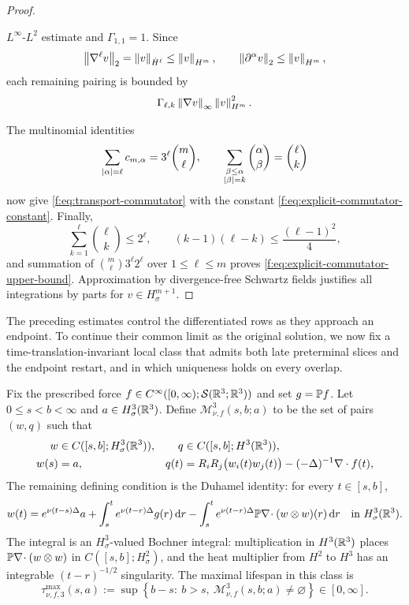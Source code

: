 \begin{proof}
\begin{samepage}
\(L^\infty\)-\(L^2\) estimate and \(\Gamma_{1,1}=1\).  Since
\[
 \left\lVert \nabla^\ell v\right\rVert_2=\left\lVert v\right\rVert_{\dot H^\ell}\le\left\lVert v\right\rVert_{H^m},
 \qquad
 \left\lVert \partial^\alpha v\right\rVert_2\le\left\lVert v\right\rVert_{H^m},
\]
each remaining pairing is bounded by
\[
 \Gamma_{\ell,k}\left\lVert \nabla v\right\rVert_\infty\left\lVert v\right\rVert_{H^m}^2.
\]
\par
\end{samepage}
The multinomial identities
\[
 \sum_{\left|\alpha\right|=\ell}c_{m,\alpha}
 =3^\ell\binom m\ell,
 \qquad
 \sum_{\substack{\beta\le\alpha\\\left|\beta\right|=k}}
 \binom\alpha\beta=\binom\ell k
\]
now give \eqref{f:eq:transport-commutator} with the constant
\eqref{f:eq:explicit-commutator-constant}.  Finally,
\[
 \sum_{k=1}^{\ell}\binom\ell k\le2^\ell,
 \qquad
 (k-1)(\ell-k)\le\frac{(\ell-1)^2}{4},
\]
and summation of
\(
 \binom m\ell3^\ell2^\ell
\)
over \(1\le\ell\le m\) proves
\eqref{f:eq:explicit-commutator-upper-bound}.  Approximation by divergence-free
Schwartz fields justifies all integrations by parts for
\(v\in H^{m+1}_\sigma\).
\end{proof}

The preceding estimates control the differentiated rows as they approach an
endpoint.  To continue their common limit as the original solution, we now fix a
time-translation-invariant local class that admits both late preterminal
slices and the endpoint restart, and in which uniqueness holds on every
overlap.

\begin{definition}
\label{f:def:shifted-normalized-H3-mild-class}
Fix the prescribed force
\(f\in C^\infty([0,\infty);\mathcal S(\mathbb R^3;\mathbb R^3))\) and set
\(g=\mathbb P f\).  Let \(0\le s<b<\infty\) and
\(a\in H^3_\sigma(\mathbb R^3)\).  Define
\(\mathscr M_{\nu,f}^3(s,b;a)\) to be the set of pairs \((w,q)\) such that
\begin{align}
 w&\in C([s,b];H^3_\sigma(\mathbb R^3)),
 &q&\in C([s,b];H^3(\mathbb R^3)),
 \label{f:eq:shifted-mild-class-spaces}\\
 w(s)&=a,
 &q(t)&=R_iR_j\bigl(w_i(t)w_j(t)\bigr)
 -(-\Delta)^{-1}\nabla\cdot f(t),
 \label{f:eq:shifted-mild-class-datum-pressure}
\end{align}
The remaining defining condition is the Duhamel identity: for every
\(t\in[s,b]\),
\begin{equation}
 w(t)=e^{\nu(t-s)\Delta}a
 +\int_s^t e^{\nu(t-r)\Delta}g(r)\,\mathrm d r
 -\int_s^t e^{\nu(t-r)\Delta}
 \mathbb P\nabla\!\cdot(w\otimes w)(r)\,\mathrm d r
 \quad\text{in }H^3_\sigma(\mathbb R^3).
 \label{f:eq:shifted-mild-class-duhamel}
\end{equation}
The integral is an \(H^3_\sigma\)-valued Bochner integral: multiplication in
\(H^3(\mathbb R^3)\) places
\(\mathbb P\nabla\!\cdot(w\otimes w)\) in \(C([s,b];H^2_\sigma)\), and the heat
multiplier from \(H^2\) to \(H^3\) has an integrable
\((t-r)^{-1/2}\) singularity.
The maximal lifespan in this class is
\begin{equation}
 \tau_{\nu,f,3}^{\max}(s,a)
 :=\sup\left\{b-s:\ b>s,\
 \mathscr M_{\nu,f}^3(s,b;a)\ne\varnothing\right\}\in[0,\infty].
 \label{f:eq:shifted-mild-maximal-lifespan}
\end{equation}
\end{definition}

